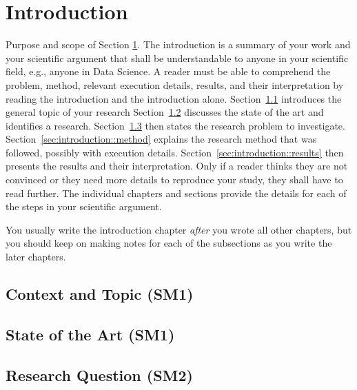 \documentclass[
	a4paper,
	pagesize,
	pdftex,
	12pt,
	ngerman,
	fleqn,
	final,
	]{scrartcl}
\theoremstyle{plain}
\theoremstyle{definition}
\begin{document}
\section{Introduction}\label{sec:introduction}
	\textsf{Purpose and scope of Section \ref{sec:introduction}}. The introduction is a summary of your work and your scientific argument that shall be understandable to anyone in your scientific field, e.g., anyone in Data Science. A reader must be able to comprehend the problem, method, relevant execution details, results, and their interpretation by reading the introduction and the introduction alone.
	Section~\ref{sec:introduction::topic} introduces the general topic of your research
	Section~\ref{sec:introduction::state-of-art} discusses the state of the art and identifies a research.
	Section~\ref{sec:introduction::research-question} then states the research problem to investigate.
	Section~\ref{sec:introduction::method} explains the research method that was followed, possibly with execution details.
	Section~\ref{sec:introduction::results} then presents the results and their interpretation. Only if a reader thinks they are not convinced or they need more details to reproduce your study, they shall have to read further. The individual chapters and sections provide the details for each of the steps in your scientific argument.
	
	You usually write the introduction chapter \emph{after} you wrote all other chapters, but you should keep on making notes for each of the subsections as you write the later chapters.
	
	\subsection{Context and Topic (SM1)}\label{sec:introduction::topic}
	
	\subsection{State of the Art (SM1)}\label{sec:introduction::state-of-art}
	
	\subsection{Research Question (SM2)}\label{sec:introduction::research-question}
	
\end{document}
